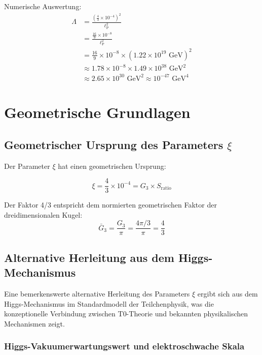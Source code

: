 \documentclass[12pt,a4paper]{article}
\newcommand{\lp}{\ell_{\text{P}}}
\theoremstyle{definition}
\begin{document}
	\begin{verhaltnis}
		Numerische Auswertung:
		\begin{align}
			\Lambda &= \frac{\left(\frac{4}{3} \times 10^{-4}\right)^2}{\lp^2}\\
			&= \frac{\frac{16}{9} \times 10^{-8}}{\lp^2}\\
			&= \frac{16}{9} \times 10^{-8} \times (1.22 \times 10^{19} \text{ GeV})^2\\
			&\approx 1.78 \times 10^{-8} \times 1.49 \times 10^{38} \text{ GeV}^2\\
			&\approx 2.65 \times 10^{30} \text{ GeV}^2 \approx 10^{-47} \text{ GeV}^4
		\end{align}
	\end{verhaltnis}
	
	\section{Geometrische Grundlagen}
	
	\subsection{Geometrischer Ursprung des Parameters $\xi$}
	
	Der Parameter $\xi$ hat einen geometrischen Ursprung:
	
	\begin{equation}
		\xi = \frac{4}{3} \times 10^{-4} = G_3 \times S_{\text{ratio}}
	\end{equation}
	
	Der Faktor 4/3 entspricht dem normierten geometrischen Faktor der dreidimensionalen Kugel:
	\begin{equation}
		\bar{G}_3 = \frac{G_3}{\pi} = \frac{4\pi/3}{\pi} = \frac{4}{3}
	\end{equation}
	
	\subsection{Alternative Herleitung aus dem Higgs-Mechanismus}
	
	Eine bemerkenswerte alternative Herleitung des Parameters $\xi$ ergibt sich aus dem Higgs-Mechanismus im Standardmodell der Teilchenphysik, was die konzeptionelle Verbindung zwischen T0-Theorie und bekannten physikalischen Mechanismen zeigt.
	
	\subsubsection{Higgs-Vakuumerwartungswert und elektroschwache Skala}
	
\end{document}
